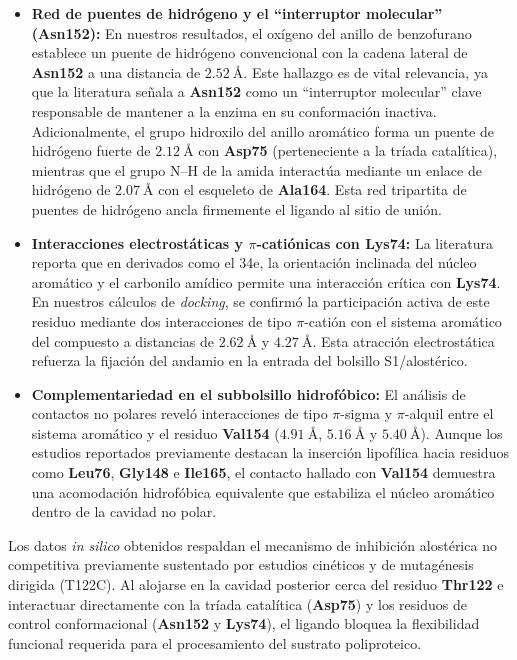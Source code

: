 \begin{itemize}
    \item \textbf{Red de puentes de hidrógeno y el ``interruptor molecular'' (\textbf{Asn152}):} En nuestros resultados, el oxígeno del anillo de benzofurano establece un puente de hidrógeno convencional con la cadena lateral de \textbf{Asn152} a una distancia de $2.52\ \text{\AA}$. Este hallazgo es de vital relevancia, ya que la literatura señala a \textbf{Asn152} como un ``interruptor molecular'' clave responsable de mantener a la enzima en su conformación inactiva. Adicionalmente, el grupo hidroxilo del anillo aromático forma un puente de hidrógeno fuerte de $2.12\ \text{\AA}$ con \textbf{Asp75} (perteneciente a la tríada catalítica), mientras que el grupo N--H de la amida interactúa mediante un enlace de hidrógeno de $2.07\ \text{\AA}$ con el esqueleto de \textbf{Ala164}. Esta red tripartita de puentes de hidrógeno ancla firmemente el ligando al sitio de unión.
    
    \item \textbf{Interacciones electrostáticas y $\pi$-catiónicas con \textbf{Lys74}:} La literatura reporta que en derivados como el 34e, la orientación inclinada del núcleo aromático y el carbonilo amídico permite una interacción crítica con \textbf{Lys74}. En nuestros cálculos de \textit{docking}, se confirmó la participación activa de este residuo mediante dos interacciones de tipo $\pi$-catión con el sistema aromático del compuesto a distancias de $2.62\ \text{\AA}$ y $4.27\ \text{\AA}$. Esta atracción electrostática refuerza la fijación del andamio en la entrada del bolsillo S1/alostérico.
    
    \item \textbf{Complementariedad en el subbolsillo hidrofóbico:} El análisis de contactos no polares reveló interacciones de tipo $\pi$-sigma y $\pi$-alquil entre el sistema aromático y el residuo \textbf{Val154} ($4.91\ \text{\AA}$, $5.16\ \text{\AA}$ y $5.40\ \text{\AA}$). Aunque los estudios reportados previamente destacan la inserción lipofílica hacia residuos como \textbf{Leu76}, \textbf{Gly148} e \textbf{Ile165}, el contacto hallado con \textbf{Val154} demuestra una acomodación hidrofóbica equivalente que estabiliza el núcleo aromático dentro de la cavidad no polar.
\end{itemize}

Los datos \textit{in silico} obtenidos respaldan el mecanismo de inhibición alostérica no competitiva previamente sustentado por estudios cinéticos  y de mutagénesis dirigida (T122C). Al alojarse en la cavidad posterior cerca del residuo \textbf{Thr122} e interactuar directamente con la tríada catalítica (\textbf{Asp75}) y los residuos de control conformacional (\textbf{Asn152} y \textbf{Lys74}), el ligando bloquea la flexibilidad funcional requerida para el procesamiento del sustrato poliproteico.


